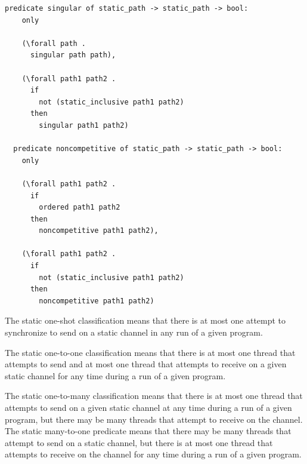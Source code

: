 \documentclass{article}
\begin{document}
\begin{lstlisting}[language=logic, mathescape]
  predicate singular of static_path -> static_path -> bool:
    only

    (\forall path .
      singular path path),

    (\forall path1 path2 .
      if
        not (static_inclusive path1 path2)
      then
        singular path1 path2)

  predicate noncompetitive of static_path -> static_path -> bool:
    only

    (\forall path1 path2 .
      if
        ordered path1 path2
      then
        noncompetitive path1 path2),

    (\forall path1 path2 .
      if
        not (static_inclusive path1 path2)
      then
        noncompetitive path1 path2)
\end{lstlisting}


The static one-shot classification means that there is at most one attempt
to synchronize to send on a static channel in any run of a given program.

The static one-to-one classification means that there is at most one thread that attempts to
send and at most one thread that attempts to receive on a given static channel for any time
during a run of a given program.

The static one-to-many classification means that there is at most one thread that attempts to
send on a given static channel at any time during a run of a given program, but there may be
many threads that attempt to receive on the channel. The static many-to-one predicate means
that there may be many threads that attempt to send on a static channel, but there is at most
one thread that attempts to receive on the channel for any time during a run of a given
program.
\end{document}

